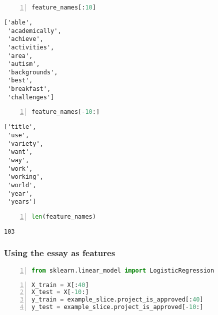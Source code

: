 \documentclass[10pt,parskip=half,
	toc=sectionentrywithdots,
	bibliography=totocnumbered,
	captions=tableheading,numbers=noendperiod]{scrartcl}
\begin{document}
\begin{lstlisting}[language=Python,numbers=left,xleftmargin=20pt,xrightmargin=5pt,belowskip=5pt,aboveskip=5pt]
feature_names[:10]
\end{lstlisting}

\begin{lstlisting}[language={},postbreak={},numbers=none,xrightmargin=7pt,breakindent=0pt,aboveskip=5pt,belowskip=5pt]
['able',
 'academically',
 'achieve',
 'activities',
 'area',
 'autism',
 'backgrounds',
 'best',
 'breakfast',
 'challenges']
\end{lstlisting}

\begin{lstlisting}[language=Python,numbers=left,xleftmargin=20pt,xrightmargin=5pt,belowskip=5pt,aboveskip=5pt]
feature_names[-10:]
\end{lstlisting}

\begin{lstlisting}[language={},postbreak={},numbers=none,xrightmargin=7pt,breakindent=0pt,aboveskip=5pt,belowskip=5pt]
['title',
 'use',
 'variety',
 'want',
 'way',
 'work',
 'working',
 'world',
 'year',
 'years']
\end{lstlisting}

\begin{lstlisting}[language=Python,numbers=left,xleftmargin=20pt,xrightmargin=5pt,belowskip=5pt,aboveskip=5pt]
len(feature_names)
\end{lstlisting}

\begin{lstlisting}[language={},postbreak={},numbers=none,xrightmargin=7pt,breakindent=0pt,aboveskip=5pt,belowskip=5pt]
103
\end{lstlisting}

\subsubsection{Using the essay as
features}\label{using-the-essay-as-features}

\begin{lstlisting}[language=Python,numbers=left,xleftmargin=20pt,xrightmargin=5pt,belowskip=5pt,aboveskip=5pt]
from sklearn.linear_model import LogisticRegression
\end{lstlisting}

\begin{lstlisting}[language=Python,numbers=left,xleftmargin=20pt,xrightmargin=5pt,belowskip=5pt,aboveskip=5pt]
X_train = X[:40]
X_test = X[-10:]
y_train = example_slice.project_is_approved[:40]
y_test = example_slice.project_is_approved[-10:]
\end{lstlisting}
\end{document}
